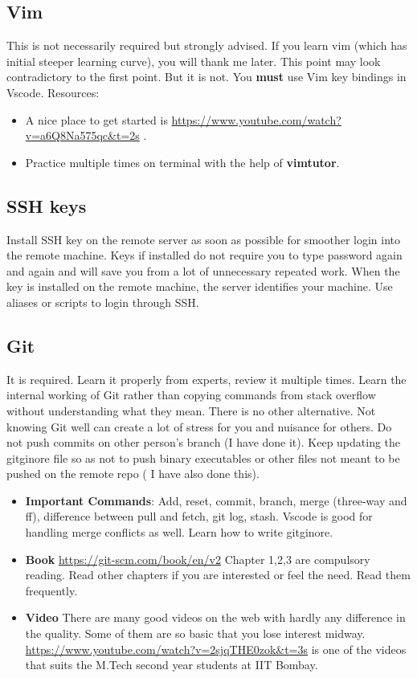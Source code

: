 \documentclass{article}
\begin{document}
\subsection{Vim}
This is not necessarily required but strongly advised. If you learn vim (which has initial steeper learning curve), you will thank me later.
This point may look contradictory to the first point. But it is not. You \textbf{must} use Vim key bindings in Vscode.
Resources:
\begin{itemize}
    \item A nice place to get started is \url{https://www.youtube.com/watch?v=a6Q8Na575qc&t=2s} .
    \item Practice multiple times on terminal with the help of \textbf{vimtutor}.
\end{itemize}
\subsection{SSH keys}

Install SSH key on the remote server as soon as possible for smoother login into the remote machine. Keys if installed do not require you to type password again and again and will save you from a lot of unnecessary repeated work. When the key is installed on the remote machine, the server identifies your machine. Use aliases or scripts to login through SSH.

\subsection{Git}
It is required. Learn it properly from experts, review it multiple times. Learn the internal working of Git rather than copying commands from stack overflow without understanding what they mean. There is no other alternative.
Not knowing Git well can create a lot of stress for you and nuisance for others. Do not push commits on other person's branch (I have done it). Keep updating the gitginore file so as not to push binary executables or other files not meant to be pushed on the remote repo ( I have also done this).
\begin{itemize}
    \item \textbf{Important Commands}: Add, reset, commit, branch, merge (three-way and ff), difference between pull and fetch, git log, stash. Vscode is good for handling merge conflicts as well. Learn how to write gitginore.
    \item \textbf{Book} \url{https://git-scm.com/book/en/v2} Chapter 1,2,3 are compulsory reading.
          Read other chapters if you are interested or feel the need. Read them frequently.
    \item \textbf{Video} There are many good videos on the web with hardly any difference in the quality. Some of them are so basic that you lose interest midway. \url{https://www.youtube.com/watch?v=2sjqTHE0zok&t=3s} is one of the videos that suits the M.Tech second year students at IIT Bombay.
\end{itemize}
\end{document}
